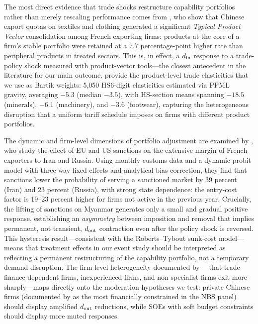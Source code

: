 The most direct evidence that trade shocks restructure capability portfolios rather
than merely rescaling performance comes from \citet{fontagne2018}, who show that
Chinese export quotas on textiles and clothing generated a significant \emph{Typical
Product Vector} consolidation among French exporting firms: products at the core of
a firm's stable portfolio were retained at a 7.7 percentage-point higher rate than
peripheral products in treated sectors. This is, in effect, a $d_{\rm in}$ response
to a trade-policy shock measured with product-vector tools---the closest antecedent
in the literature for our main outcome. \citet{fontagne2022} provide the
product-level trade elasticities that we use as Bartik weights: 5,050 HS6-digit
elasticities estimated via PPML gravity, averaging $-5.3$ (median $-3.5$), with
HS-section means spanning $-18.5$ (minerals), $-6.1$ (machinery), and $-3.6$
(footwear), capturing the heterogeneous disruption that a uniform tariff schedule
imposes on firms with different product portfolios.

The dynamic and firm-level dimensions of portfolio adjustment are examined by
\citet{crozet2021}, who study the effect of EU and US sanctions on the extensive
margin of French exporters to Iran and Russia. Using monthly customs data and a
dynamic probit model with three-way fixed effects and analytical bias correction,
they find that sanctions lower the probability of serving a sanctioned market by 39
percent (Iran) and 23 percent (Russia), with strong state dependence: the entry-cost
factor is 19--23 percent higher for firms not active in the previous year. Crucially,
the lifting of sanctions on Myanmar generates only a small and gradual positive response,
establishing an \emph{asymmetry} between imposition and removal that implies permanent,
not transient, $d_{\rm out}$ contraction even after the policy shock is reversed.
This hysteresis result---consistent with the Roberts--Tybout sunk-cost model---means
that treatment effects in our event study should be interpreted as reflecting a
permanent restructuring of the capability portfolio, not a temporary demand disruption.
The firm-level heterogeneity documented by \citet{crozet2021}---that trade-finance-dependent
firms, inexperienced firms, and non-specialist firms exit more sharply---maps
directly onto the moderation hypotheses we test: private Chinese firms (documented
by \citet{guariglia2011} as the most financially constrained in the NBS panel) should
display amplified $d_{\rm out}$ reductions, while SOEs with soft budget constraints
should display more muted responses.

